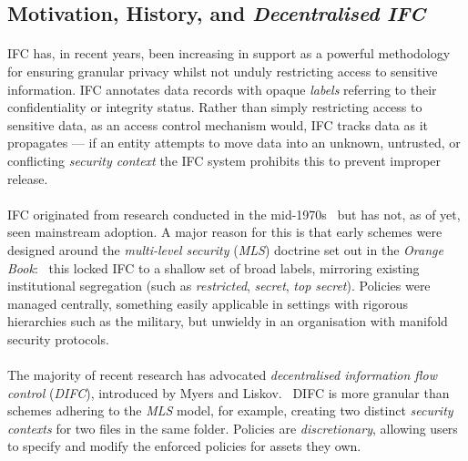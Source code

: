 \subsection{Motivation, History, and \textit{Decentralised IFC}}

\paragraph{} IFC has, in recent years, been increasing in support as a powerful methodology for ensuring granular privacy whilst not unduly restricting access to sensitive information. IFC annotates data records with opaque \textit{labels} referring to their confidentiality or integrity status. Rather than simply restricting access to sensitive data, as an access control mechanism would, IFC tracks data as it propagates --- if an entity attempts to move data into an unknown, untrusted, or conflicting \textit{security context} the IFC system prohibits this to prevent improper release.

\paragraph{} IFC originated from research conducted in the mid-1970s~\cite{ifc-lattice} but has not, as of yet, seen mainstream adoption. A major reason for this is that early schemes were designed around the \textit{multi-level security} (\textit{MLS}) doctrine set out in the \textit{Orange Book}:~\cite{orange-book} this locked IFC to a shallow set of broad labels, mirroring existing institutional segregation (such as \textit{restricted}, \textit{secret}, \textit{top secret}). Policies were managed centrally, something easily applicable in settings with rigorous hierarchies such as the military, but unwieldy in an organisation with manifold security protocols.

\paragraph{} The majority of recent research has advocated \textit{decentralised information flow control} 
(\textit{DIFC}), introduced by Myers and Liskov.~\cite{difc,10.1145/363516.363526,10.1145/268998.266669} DIFC is more granular than schemes adhering to the \textit{MLS} model, for example, creating two distinct \textit{security contexts} for two files in the same folder. Policies are \textit{discretionary}, allowing users to specify and modify the enforced policies for assets they own.

